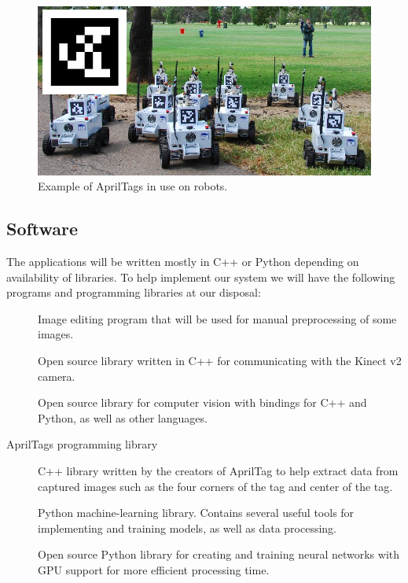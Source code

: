 \begin{figure}
	\centering
	\includegraphics[width=\textwidth]{img/methods/apriltagrobots_overlay.jpg}
	\caption{Example of AprilTags in use on robots.}
\end{figure}

\subsection*{Software}

The applications will be written mostly in C++ or Python depending on availability of libraries. To help implement our system we will have the following programs and programming libraries at our disposal:

\begin{description}
	\item[\textcite{GIMP}] Image editing program that will be used for manual preprocessing of some images.

	\item[\textcite{libfreenect2}] Open source library written in C++ for communicating with the Kinect v2 camera.

	\item[\textcite{OpenCV}] Open source library for computer vision with bindings for C++ and Python, as well as other languages.

	\item[AprilTags programming library] C++ library written by the creators of AprilTag to help extract data from captured images such as the four corners of the tag and center of the tag.

	\item[\textcite{scikitlearn}] Python machine-learning library. Contains several useful tools for implementing and training models, as well as data processing.

	\item[\textcite{Tensorflow}] Open source Python library for creating and training neural networks with GPU support for more efficient processing time.

\end{description}


